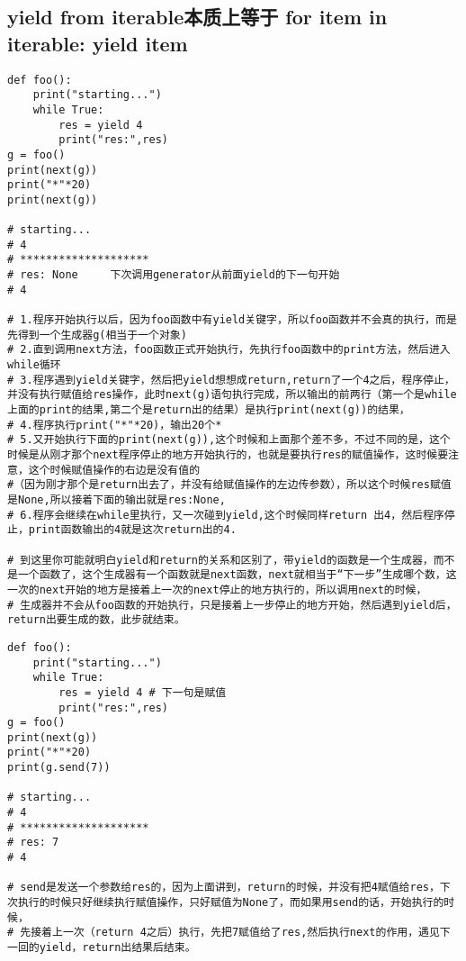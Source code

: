 \documentclass[11pt]{article}
\begin{document}
\subsection{yield from iterable本质上等于 for item in iterable: yield item}
\label{sec:orgfbef080}
\begin{verbatim}
def foo():
    print("starting...")
    while True:
        res = yield 4
        print("res:",res)
g = foo()
print(next(g))
print("*"*20)
print(next(g))

# starting...  
# 4      
# ********************
# res: None     下次调用generator从前面yield的下一句开始
# 4

# 1.程序开始执行以后，因为foo函数中有yield关键字，所以foo函数并不会真的执行，而是先得到一个生成器g(相当于一个对象)
# 2.直到调用next方法，foo函数正式开始执行，先执行foo函数中的print方法，然后进入while循环
# 3.程序遇到yield关键字，然后把yield想想成return,return了一个4之后，程序停止，并没有执行赋值给res操作，此时next(g)语句执行完成，所以输出的前两行（第一个是while上面的print的结果,第二个是return出的结果）是执行print(next(g))的结果，
# 4.程序执行print("*"*20)，输出20个*
# 5.又开始执行下面的print(next(g)),这个时候和上面那个差不多，不过不同的是，这个时候是从刚才那个next程序停止的地方开始执行的，也就是要执行res的赋值操作，这时候要注意，这个时候赋值操作的右边是没有值的
#（因为刚才那个是return出去了，并没有给赋值操作的左边传参数），所以这个时候res赋值是None,所以接着下面的输出就是res:None,
# 6.程序会继续在while里执行，又一次碰到yield,这个时候同样return 出4，然后程序停止，print函数输出的4就是这次return出的4.

# 到这里你可能就明白yield和return的关系和区别了，带yield的函数是一个生成器，而不是一个函数了，这个生成器有一个函数就是next函数，next就相当于“下一步”生成哪个数，这一次的next开始的地方是接着上一次的next停止的地方执行的，所以调用next的时候，
# 生成器并不会从foo函数的开始执行，只是接着上一步停止的地方开始，然后遇到yield后，return出要生成的数，此步就结束。

\end{verbatim}

\begin{verbatim}
def foo():
    print("starting...")
    while True:
        res = yield 4 # 下一句是赋值
        print("res:",res)
g = foo()
print(next(g))
print("*"*20)
print(g.send(7)) 

# starting...
# 4
# ********************
# res: 7
# 4

# send是发送一个参数给res的，因为上面讲到，return的时候，并没有把4赋值给res，下次执行的时候只好继续执行赋值操作，只好赋值为None了，而如果用send的话，开始执行的时候，
# 先接着上一次（return 4之后）执行，先把7赋值给了res,然后执行next的作用，遇见下一回的yield，return出结果后结束。

\end{verbatim}
\end{document}
